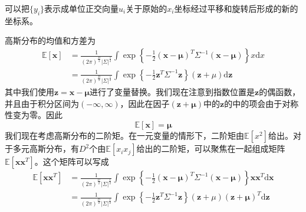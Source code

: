 可以把$\{y_i\}$表示成单位正交向量$u_i$关于原始的$x_i$坐标经过平移和旋转后形成的新的坐标系。
\begin{center}
\end{center}
高斯分布的均值和方差为
\begin{equation}
\begin{aligned}
	\mathbb{E}[\boldsymbol{x}]&=\frac{1}{(2\pi)^{\frac{D}{2}}|\Sigma|^{\frac{1}{2}}}\int\exp\left\{-\frac{1}{2}(\boldsymbol{x}-\boldsymbol{\mu})^T\Sigma^{-1}(\boldsymbol{x}-\boldsymbol{\mu}) \right\}x\mathrm{d}x\\
	&=\frac{1}{(2\pi)^{\frac{D}{2}}|\Sigma|^{\frac{1}{2}}}\int\exp\left\{-\frac{1}{2}\boldsymbol{z}^T\Sigma^{-1}\boldsymbol{z} \right\}(\boldsymbol{z}+\mu)\mathrm{d}\boldsymbol{z}
\end{aligned}
\end{equation}
其中我们使用$\boldsymbol{z}=\boldsymbol{x}-\boldsymbol{\mu}$进行了变量替换。我们现在注意到指数位置是$\boldsymbol{z}$的偶函数，并且由于积分区间为$(-\infty,\infty)$，因此在因子$(\boldsymbol{z}+\boldsymbol{\mu})$中的$\boldsymbol{z}$的中的项会由于对称性变为零。因此
\begin{equation}
	\mathbb{E}[\boldsymbol{x}]=\boldsymbol{\mu}
\end{equation}
我们现在考虑高斯分布的二阶矩。在一元变量的情形下，二阶矩由$\mathbb{E}[x^2]$给出。对于多元高斯分布，有$D^2$个由$\mathbb{E}[x_ix_j]$给出的二阶矩，可以聚焦在一起组成矩阵$\mathbb{E}[\boldsymbol{xx}^T]$。这个矩阵可以写成
\begin{equation}
\begin{aligned}
	\mathbb{E}[\boldsymbol{xx}^T]&=\frac{1}{(2\pi)^{\frac{D}{2}}|\Sigma|^{\frac{1}{2}}}\int\exp\left\{-\frac{1}{2}(\boldsymbol{x}-\boldsymbol{\mu})^T\Sigma^{-1}(\boldsymbol{x}-\boldsymbol{\mu}) \right\}\boldsymbol{xx}^T\mathrm{d}\boldsymbol{x}\\
	&=\frac{1}{(2\pi)^{\frac{D}{2}}|\Sigma|^{\frac{1}{2}}}\int\exp\left\{-\frac{1}{2}\boldsymbol{z}^T\Sigma^{-1}\boldsymbol{z} \right\}(\boldsymbol{z}+\mu)(\boldsymbol{z}+\boldsymbol{\mu})^T\mathrm{d}\boldsymbol{z}
\end{aligned}
\end{equation}
